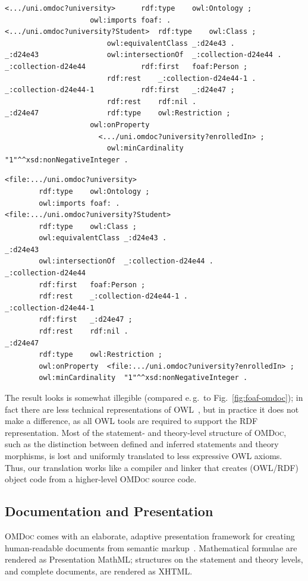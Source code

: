 \documentclass{llncs}
\renewcommand{\omdoc}{\textsc{OMDoc}\xspace}
\begin{document}
\ifpublic
\begin{lstlisting}[language={}]
<.../uni.omdoc?university>		rdf:type	owl:Ontology ;
					owl:imports	foaf: .
<.../uni.omdoc?university?Student>	rdf:type	owl:Class ;
				        owl:equivalentClass _:d24e43 .
_:d24e43				owl:intersectionOf	_:collection-d24e44 .
_:collection-d24e44 			rdf:first	foaf:Person ;
		        		rdf:rest	_:collection-d24e44-1 .
_:collection-d24e44-1			rdf:first	_:d24e47 ;
		        		rdf:rest	rdf:nil .
_:d24e47				rdf:type	owl:Restriction ;
					owl:onProperty
					  <.../uni.omdoc?university?enrolledIn> ;
		        		owl:minCardinality  "1"^^xsd:nonNegativeInteger .
\end{lstlisting}
\else
\begin{lstlisting}[language={}]
<file:.../uni.omdoc?university>
        rdf:type	owl:Ontology ;
        owl:imports	foaf: .
<file:.../uni.omdoc?university?Student>
        rdf:type	owl:Class ;
        owl:equivalentClass _:d24e43 .
_:d24e43
        owl:intersectionOf  _:collection-d24e44 .
_:collection-d24e44
        rdf:first	foaf:Person ;
        rdf:rest	_:collection-d24e44-1 .
_:collection-d24e44-1
        rdf:first	_:d24e47 ;
        rdf:rest	rdf:nil .
_:d24e47
        rdf:type	owl:Restriction ;
        owl:onProperty	<file:.../uni.omdoc?university?enrolledIn> ;
        owl:minCardinality  "1"^^xsd:nonNegativeInteger .
\end{lstlisting}
\fi

The result looks is somewhat illegible (compared e.\,g.\ to Fig.~\ref{fig:foaf-omdoc}); in
fact there are less technical representations of OWL~\cite{w3c:owl2-manchester}, but in
practice it does not make a difference, as all OWL tools are required to support the RDF
representation.  Most of the statement- and theory-level structure of \omdoc, such as the
distinction between defined and inferred statements and theory morphisms, is lost and
uniformly translated to less expressive OWL axioms.  Thus, our translation works like a
compiler and linker that creates (OWL/RDF) object code from a higher-level \omdoc source
code.

\subsection{Documentation and Presentation}\label{sec:presentation}

\omdoc comes with an elaborate, adaptive presentation framework for creating
human-readable documents from semantic markup~\cite{KMR:NoLMD08}.  Mathematical formulae
are rendered as Presentation MathML; structures on the statement and theory levels, and
complete documents, are rendered as XHTML.  \ifpublic\else
\end{document}
